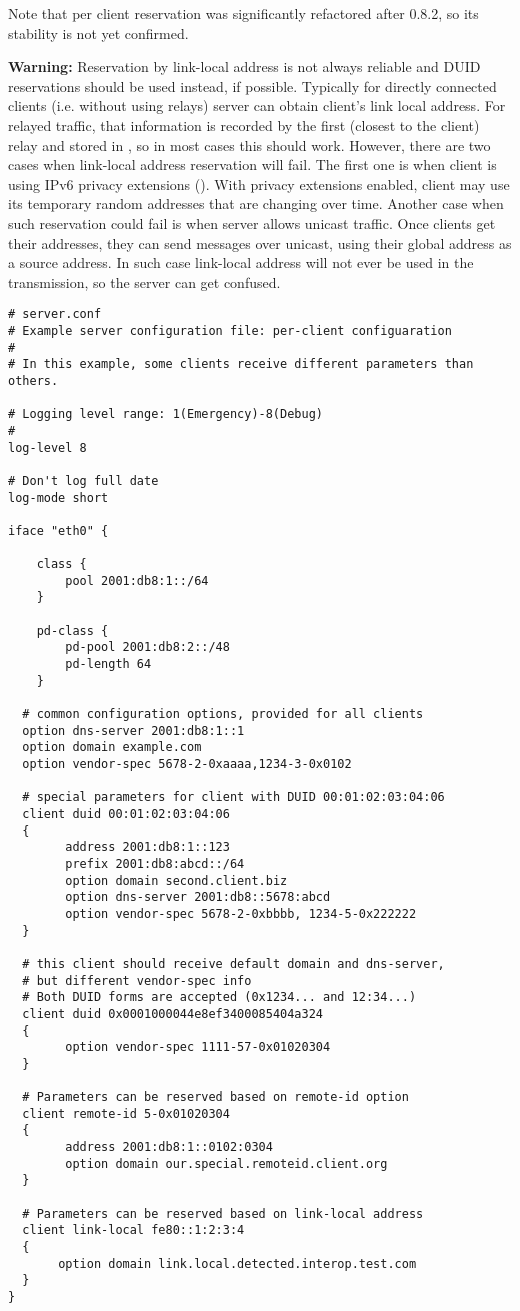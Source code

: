 Note that per client reservation was significantly refactored after
0.8.2, so its stability is not yet confirmed.

\textbf{Warning:} Reservation by link-local address is not always
reliable and DUID reservations should be used instead, if
possible. Typically for directly connected clients (i.e. without using
relays) server can obtain client's link local address. For relayed
traffic, that information is recorded by the first (closest to the
client) relay and stored in , so in most cases this
should work. However, there are two cases when link-local address
reservation will fail. The first one is when client is using IPv6
privacy extensions (\cite{rfc4941}). With privacy extensions enabled,
client may use its temporary random addresses that are changing over
time. Another case when such reservation could fail is when server
allows unicast traffic. Once clients get their addresses, they can
send  messages over unicast, using their global address as
a source address. In such case link-local address will not ever be
used in the transmission, so the server can get confused.

\begin{lstlisting}
# server.conf
# Example server configuration file: per-client configuaration
#
# In this example, some clients receive different parameters than others.

# Logging level range: 1(Emergency)-8(Debug)
#
log-level 8

# Don't log full date
log-mode short

iface "eth0" {

    class {
        pool 2001:db8:1::/64
    }

    pd-class {
        pd-pool 2001:db8:2::/48
        pd-length 64
    }

  # common configuration options, provided for all clients
  option dns-server 2001:db8:1::1
  option domain example.com
  option vendor-spec 5678-2-0xaaaa,1234-3-0x0102

  # special parameters for client with DUID 00:01:02:03:04:06
  client duid 00:01:02:03:04:06
  {
        address 2001:db8:1::123
        prefix 2001:db8:abcd::/64
        option domain second.client.biz
        option dns-server 2001:db8::5678:abcd
        option vendor-spec 5678-2-0xbbbb, 1234-5-0x222222
  }

  # this client should receive default domain and dns-server,
  # but different vendor-spec info
  # Both DUID forms are accepted (0x1234... and 12:34...)
  client duid 0x0001000044e8ef3400085404a324
  {
        option vendor-spec 1111-57-0x01020304
  }

  # Parameters can be reserved based on remote-id option
  client remote-id 5-0x01020304
  {
        address 2001:db8:1::0102:0304
        option domain our.special.remoteid.client.org
  }

  # Parameters can be reserved based on link-local address
  client link-local fe80::1:2:3:4
  {
       option domain link.local.detected.interop.test.com
  }
}

\end{lstlisting}

